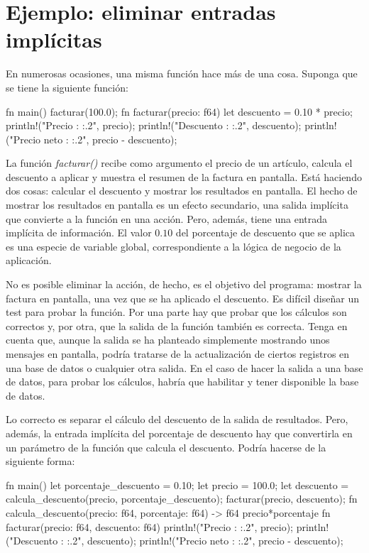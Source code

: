 \section{Ejemplo: eliminar entradas implícitas}
En numerosas ocasiones, una misma función hace más de una cosa. Suponga que se tiene la siguiente función:

\vspace{0.7em}
\begin{Codigo}
fn main() {
   facturar(100.0);
}
fn facturar(precio: f64) {
   let descuento = 0.10 * precio;
   println!("Precio      : {:.2}", precio);
   println!("Descuento   : {:.2}", descuento);
   println!("Precio neto : {:.2}", precio - descuento);
}
\end{Codigo}

La función \textit{facturar()} recibe como argumento el precio de un artículo, calcula el descuento a aplicar y muestra el resumen de la factura en pantalla. Está haciendo dos cosas: calcular el descuento y mostrar los resultados en pantalla. El hecho de mostrar los resultados en pantalla es un efecto secundario, una salida implícita que convierte a la función en una acción. Pero, además, tiene una entrada implícita de información. El valor $0.10$ del porcentaje de descuento que se aplica es una especie de variable global, correspondiente a la lógica de negocio de la aplicación.

No es posible eliminar la acción, de hecho, es el objetivo del programa: mostrar la factura en pantalla, una vez que se ha aplicado el descuento. Es difícil diseñar un test para probar la función. Por una parte hay que probar que los cálculos son correctos y, por otra, que la salida de la función también es correcta. Tenga en cuenta que, aunque la salida se ha planteado simplemente mostrando unos mensajes en pantalla, podría tratarse de la actualización de ciertos registros en una base de datos o cualquier otra salida. En el caso de hacer la salida a una base de datos, para probar los cálculos, habría que habilitar y tener disponible la base de datos.

Lo correcto es separar el cálculo del descuento de la salida de resultados. Pero, además, la entrada implícita del porcentaje de descuento hay que convertirla en un parámetro de la función que calcula el descuento. Podría hacerse de la siguiente forma:

\vspace{0.7em}
\begin{Codigo}
fn main() {
   let porcentaje_descuento = 0.10;
   let precio = 100.0;
   let descuento = 
       calcula_descuento(precio, porcentaje_descuento);
   facturar(precio, descuento);
}
fn calcula_descuento(precio: f64, porcentaje: f64) -> f64 {
   precio*porcentaje
}
fn facturar(precio: f64, descuento: f64) {
   println!("Precio      : {:.2}", precio);
   println!("Descuento   : {:.2}", descuento);
   println!("Precio neto : {:.2}", precio - descuento);
}
\end{Codigo}

